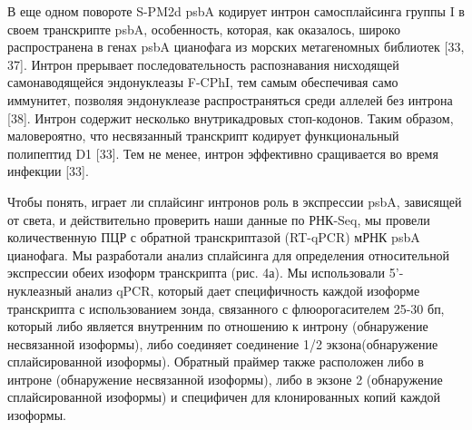 \documentclass[a4paper,12pt]{article}
\begin{document}
            \par{В еще одном повороте S-PM2d psbA кодирует интрон самосплайсинга группы I в своем транскрипте psbA,
            особенность, которая, как оказалось, широко распространена в генах psbA цианофага из морских метагеномных
            библиотек [33, 37]. Интрон прерывает последовательность распознавания нисходящей самонаводящейся
            эндонуклеазы F-CPhI, тем самым обеспечивая само иммунитет, позволяя эндонуклеазе распространяться среди
            аллелей без интрона [38]. Интрон содержит несколько внутрикадровых стоп-кодонов. Таким образом,
            маловероятно, что несвязанный транскрипт кодирует функциональный полипептид D1 [33]. Тем не менее, интрон
            эффективно сращивается во время инфекции [33].}
            \par{Чтобы понять, играет ли сплайсинг интронов роль в экспрессии psbA, зависящей от света, и действительно
            проверить наши данные по РНК-Seq, мы провели количественную ПЦР с обратной транскриптазой (RT-qPCR) мРНК
            psbA цианофага. Мы разработали анализ сплайсинга для определения относительной экспрессии обеих изоформ
            транскрипта (рис. 4а). Мы использовали 5'-нуклеазный анализ qPCR, который дает специфичность каждой
            изоформе транскрипта с использованием зонда, связанного с флюорогасителем 25-30 бп, который либо является
            внутренним по отношению к интрону (обнаружение несвязанной изоформы), либо соединяет соединение 1/2
            экзона(обнаружение сплайсированной изоформы). Обратный праймер также расположен либо в интроне (обнаружение
            несвязанной изоформы), либо в экзоне 2 (обнаружение сплайсированной изоформы) и специфичен для
            клонированных копий каждой изоформы.}
\end{document}
